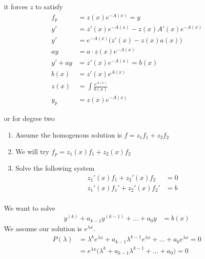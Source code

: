\documentclass[10pt]{article}
\begin{document}
\begin{multicols*}{3}
\begin{enumerate}[label=(\arabic*)]
          it forces $z$ to satisfy
          \begin{align*}
            f_p     & = z(x) e^{-A(x)} = y                      \\
            y'      & = z'(x) e^{-A(x)} - z(x) A'(x) e^{-A(x)}  \\
            y'      & = e^{-A(x)} \Big (z'(x) - z(x) a(x)\Big ) \\
            ay      & = a \cdot z(x) e^{-A(x)}                  \\
            y' + ay & = z'(x) e^{-A(x)} = b(x)                  \\
            b(x)    & = z'(x) e^{A(x)}                          \\
            z(x)    & = \int \frac{e^{A(x)}}{b(x)}              \\
            y_p     & = z(x) e^{-A(x)}
          \end{align*}
  \end{enumerate}
  or for degree two
  \begin{enumerate}[label=(\arabic*)]
    \item Assume the homogenous solution is $f = z_1 f_1 + z_2 f_2$
    \item We will try $f_p = z_1(x) f_1 + z_2(x) f_2$
    \item Solve the following system
          \begin{align*}
            z_1'(x) f_1 + z_2'(x) f_2   & = 0 \\
            z_1'(x) f_1' + z_2'(x) f_2' & = b \\
          \end{align*}
  \end{enumerate}
  We want to solve
  \begin{align*}
    y^{(k)} + a_{k-1}y^{(k-1)} + \dots + a_0 y & = b(x)
  \end{align*}
  We assume our solution is $e^{\lambda x}$.
  \begin{align*}
    P(\lambda)    & = \lambda^k e^{\lambda x} + a_{k-1} \lambda^{k-1} e^{\lambda x} + \dots + a_0 e^{\lambda x} = 0 \\
                  & = e^{\lambda x} \Big( \lambda^k + a_{k-1}\lambda^{k-1} + \dots + a_0 \Big) = 0                  \\

\end{align*}
\end{multicols*}
\end{document}
